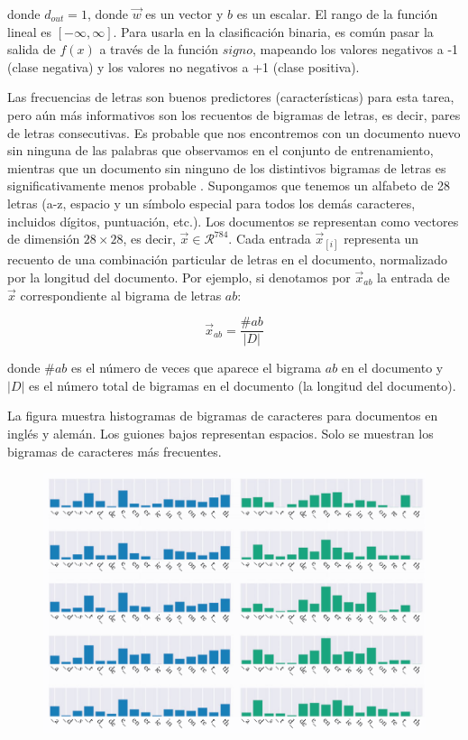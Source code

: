 donde $d_{out} = 1$, donde $\vec{w}$ es un vector y $b$ es un escalar. El rango de la función lineal es $[-\infty, \infty]$. Para usarla en la clasificación binaria, es común pasar la salida de $f(x)$ a través de la función $signo$, mapeando los valores negativos a -1 (clase negativa) y los valores no negativos a +1 (clase positiva).

Las frecuencias de letras son buenos predictores (características) para esta tarea, pero aún más informativos son los recuentos de bigramas de letras, es decir, pares de letras consecutivas. Es probable que nos encontremos con un documento nuevo sin ninguna de las palabras que observamos en el conjunto de entrenamiento, mientras que un documento sin ninguno de los distintivos bigramas de letras es significativamente menos probable \cite{goldberg2017neural}. Supongamos que tenemos un alfabeto de 28 letras (a-z, espacio y un símbolo especial para todos los demás caracteres, incluidos dígitos, puntuación, etc.). Los documentos se representan como vectores de dimensión $28 \times 28$, es decir, $\vec{x} \in \mathcal{R}^{784}$. Cada entrada $\vec{x}_{[i]}$ representa un recuento de una combinación particular de letras en el documento, normalizado por la longitud del documento. Por ejemplo, si denotamos por $\vec{x}_{ab}$ la entrada de $\vec{x}$ correspondiente al bigrama de letras $ab$:

\begin{equation}
\vec{x}_{ab} = \frac{\#ab}{|D|}
\end{equation}

donde $\#ab$ es el número de veces que aparece el bigrama $ab$ en el documento y $|D|$ es el número total de bigramas en el documento (la longitud del documento).

La figura muestra histogramas de bigramas de caracteres para documentos en inglés y alemán. Los guiones bajos representan espacios. Solo se muestran los bigramas de caracteres más frecuentes.

\begin{figure}[htb]
	\centering
	 \includegraphics[scale=0.26]{pics/langbigrams.png}
\end{figure}

